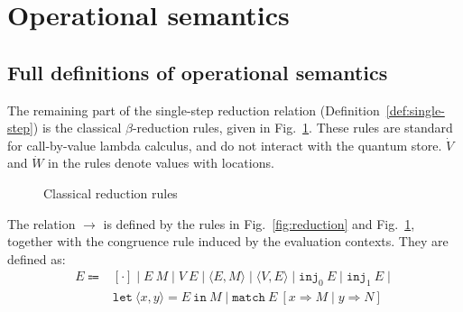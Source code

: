 \section{Operational semantics}
\subsection{Full definitions of operational semantics} \label{sec:opsem-full}
The remaining part of the single-step reduction relation (Definition~\ref{def:single-step}) is the classical $\beta$-reduction rules, given in Fig.~\ref{fig:reduction-beta}.
These rules are standard for call-by-value lambda calculus, and do not interact with the quantum store.
$\dot{V}$ and $\dot{W}$ in the rules denote values with locations.
\begin{figure}[ht]
  \caption{Classical reduction rules}
  \label{fig:reduction-beta}
\end{figure}

The relation $\longrightarrow$ is defined by the rules in Fig.~\ref{fig:reduction} and Fig.~\ref{fig:reduction-beta}, together with the congruence rule induced by the evaluation contexts.
They are defined as:
\begin{equation*}
  \begin{array}{rl}
    E \Coloneqq & [\cdot]\mid E\ M\mid V\ E\mid\langle E, M\rangle\mid\langle V,E\rangle\mid\texttt{inj}_0\ E\mid\texttt{inj}_1\ E\mid \\
                & \texttt{let}\ \langle x,y\rangle=E\ \texttt{in}\ M\mid\texttt{match}\ E\ [x\Rightarrow M\mid y\Rightarrow N ]
  \end{array}
\end{equation*}


